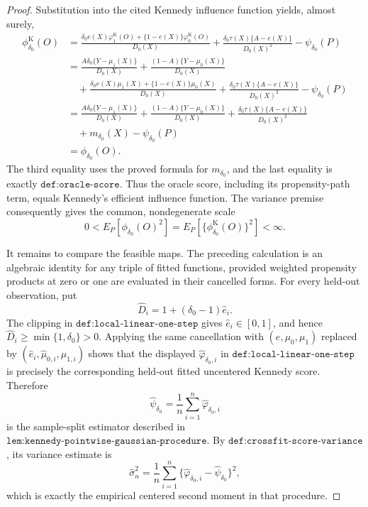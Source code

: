 \documentclass{article}
\begin{document}
\begin{proof}
Substitution into the cited Kennedy influence function yields, almost
surely,
\[
\begin{aligned}
\phi_{\delta_0}^{\mathrm K}(O)
&=\frac{\delta_0e(X)\varphi_1^{\mathrm K}(O)
       +\{1-e(X)\}\varphi_0^{\mathrm K}(O)}{D_0(X)}
  +\frac{\delta_0\tau(X)\{A-e(X)\}}{D_0(X)^2}
  -\psi_{\delta_0}(P)\\
&=\frac{A\delta_0\{Y-\mu_1(X)\}}{D_0(X)}
  +\frac{(1-A)\{Y-\mu_0(X)\}}{D_0(X)}\\
&\quad
  +\frac{\delta_0e(X)\mu_1(X)+\{1-e(X)\}\mu_0(X)}{D_0(X)}
  +\frac{\delta_0\tau(X)\{A-e(X)\}}{D_0(X)^2}
  -\psi_{\delta_0}(P)\\
&=\frac{A\delta_0\{Y-\mu_1(X)\}}{D_0(X)}
  +\frac{(1-A)\{Y-\mu_0(X)\}}{D_0(X)}
  +\frac{\delta_0\tau(X)\{A-e(X)\}}{D_0(X)^2}\\
&\quad +m_{\delta_0}(X)-\psi_{\delta_0}(P)\\
&=\phi_{\delta_0}(O).
\end{aligned}
\]
The third equality uses the proved formula for \(m_{\delta_0}\), and the
last equality is exactly \(\texttt{def:oracle-score}\).  Thus the oracle
score, including its propensity-path term, equals Kennedy's efficient
influence function.  The variance premise consequently gives the common,
nondegenerate scale
\[
0<E_P\!\left[\phi_{\delta_0}(O)^2\right]
=E_P\!\left[\{\phi_{\delta_0}^{\mathrm K}(O)\}^2\right]<\infty.
\]

It remains to compare the feasible maps.  The preceding calculation is
an algebraic identity for any triple of fitted functions, provided
weighted propensity products at zero or one are evaluated in their
cancelled forms.  For every held-out observation, put
\[
\widehat D_i=1+(\delta_0-1)\widehat e_i.
\]
The clipping in \(\texttt{def:local-linear-one-step}\) gives
\(\widehat e_i\in[0,1]\), and hence
\(\widehat D_i\geq\min\{1,\delta_0\}>0\).  Applying the same cancellation
with \((e,\mu_0,\mu_1)\) replaced by
\((\widehat e_i,\widehat\mu_{0,i},\widehat\mu_{1,i})\) shows that the
displayed \(\widehat\varphi_{\delta_0,i}\) in
\(\texttt{def:local-linear-one-step}\) is precisely the corresponding
held-out fitted uncentered Kennedy score.  Therefore
\[
\widehat\psi_{\delta_0}
=\frac1n\sum_{i=1}^n\widehat\varphi_{\delta_0,i}
\]
is the sample-split estimator described in
\(\texttt{lem:kennedy-pointwise-gaussian-procedure}\).  By
\(\texttt{def:crossfit-score-variance}\), its variance estimate is
\[
\widehat\sigma_n^2
=\frac1n\sum_{i=1}^n
 \{\widehat\varphi_{\delta_0,i}-\widehat\psi_{\delta_0}\}^2,
\]
which is exactly the empirical centered second moment in that procedure.


\end{proof}
\end{document}
